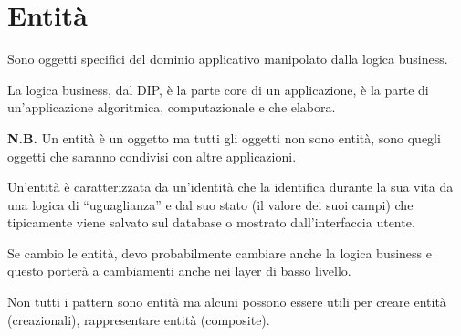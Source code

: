 \chapter{Entità}

Sono oggetti specifici del dominio applicativo manipolato dalla logica business.

La logica business, dal DIP, è la parte core di un applicazione, è la parte di un’applicazione algoritmica, computazionale e che elabora.
\medskip

\textbf{N.B.} Un entità è un oggetto ma tutti gli oggetti non sono entità, sono quegli oggetti che saranno condivisi con altre applicazioni.
\medskip

Un’entità è caratterizzata da un’identità che la identifica durante la sua vita da una logica di “uguaglianza” e dal suo stato (il valore dei suoi campi) che 
tipicamente viene salvato sul database o mostrato dall’interfaccia utente.

Se cambio le entità, devo probabilmente cambiare anche la logica business e questo porterà a cambiamenti anche nei layer di basso livello.

Non tutti i pattern sono entità ma alcuni possono essere utili per creare entità (creazionali), rappresentare entità (composite).

